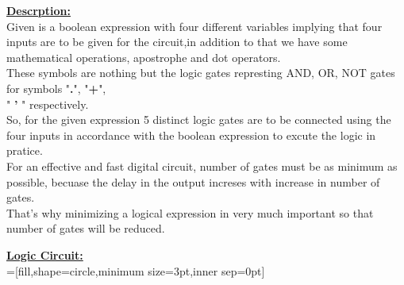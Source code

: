 \documentclass[10pt,a4paper]{report}
\begin{document}
\begin{multicols}{2}
\begin{center}
\begin{tabular}{|c|c|c|}
   \end{tabular}
 \end{center} \vspace{5mm}
\raggedright \large \textbf{\underline{Descrption:}} \normalsize \vspace{2mm}
\\ \hspace{4mm} Given is a boolean expression with four different variables implying that four inputs are to be given for the circuit,in addition to that we have some mathematical operations, apostrophe and dot operators. \vspace{2mm}
\\ \hspace{4mm} These symbols are nothing but the logic gates represting AND, OR, NOT gates for symbols "\textbf{.}",  "\textbf{+}",  \\ " \textbf{'} "  respectively. \vspace{2mm}
\\ \hspace{4mm} So, for the given expression 5 distinct logic gates  are to be connected using the four inputs in accordance with the boolean expression to excute the logic in pratice. \vspace{2mm}
\\ \hspace{4mm} For an effective and fast digital circuit, number of gates must be as minimum as possible, becuase the delay in the output increses with increase in number of gates. \vspace{2mm}
\\ \hspace{4mm} That's why minimizing a logical expression in very much important so that number of gates will be reduced. \vspace{15mm}
\\ \raggedright \large \textbf{\underline{Logic Circuit:}} \normalsize \vspace{10mm}
\\ \centering
{}=[fill,shape=circle,minimum size=3pt,inner sep=0pt]

\end{multicols}
\end{document}
